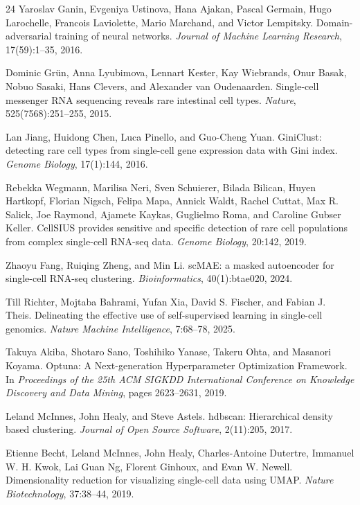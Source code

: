\documentclass[11pt,a4paper]{article}
\begin{document}
\begin{thebibliography}{24}
Yaroslav Ganin, Evgeniya Ustinova, Hana Ajakan, Pascal Germain, Hugo Larochelle, Francois Laviolette, Mario Marchand, and Victor Lempitsky.
\newblock Domain-adversarial training of neural networks.
\newblock \textit{Journal of Machine Learning Research}, 17(59):1--35, 2016.


Dominic Grün, Anna Lyubimova, Lennart Kester, Kay Wiebrands, Onur Basak, Nobuo Sasaki, Hans Clevers, and Alexander van Oudenaarden.
\newblock Single-cell messenger RNA sequencing reveals rare intestinal cell types.
\newblock \textit{Nature}, 525(7568):251--255, 2015.

Lan Jiang, Huidong Chen, Luca Pinello, and Guo-Cheng Yuan.
\newblock GiniClust: detecting rare cell types from single-cell gene expression data with Gini index.
\newblock \textit{Genome Biology}, 17(1):144, 2016.

Rebekka Wegmann, Marilisa Neri, Sven Schuierer, Bilada Bilican, Huyen Hartkopf, Florian Nigsch, Felipa Mapa, Annick Waldt, Rachel Cuttat, Max R. Salick, Joe Raymond, Ajamete Kaykas, Guglielmo Roma, and Caroline Gubser Keller.
\newblock CellSIUS provides sensitive and specific detection of rare cell populations from complex single-cell RNA-seq data.
\newblock \textit{Genome Biology}, 20:142, 2019.

Zhaoyu Fang, Ruiqing Zheng, and Min Li.
\newblock scMAE: a masked autoencoder for single-cell RNA-seq clustering.
\newblock \textit{Bioinformatics}, 40(1):btae020, 2024.

Till Richter, Mojtaba Bahrami, Yufan Xia, David S. Fischer, and Fabian J. Theis.
\newblock Delineating the effective use of self-supervised learning in single-cell genomics.
\newblock \textit{Nature Machine Intelligence}, 7:68--78, 2025.

Takuya Akiba, Shotaro Sano, Toshihiko Yanase, Takeru Ohta, and Masanori Koyama.
\newblock Optuna: A Next-generation Hyperparameter Optimization Framework.
\newblock In \textit{Proceedings of the 25th ACM SIGKDD International Conference on Knowledge Discovery and Data Mining}, pages 2623--2631, 2019.

Leland McInnes, John Healy, and Steve Astels.
\newblock hdbscan: Hierarchical density based clustering.
\newblock \textit{Journal of Open Source Software}, 2(11):205, 2017.

Etienne Becht, Leland McInnes, John Healy, Charles-Antoine Dutertre, Immanuel W. H. Kwok, Lai Guan Ng, Florent Ginhoux, and Evan W. Newell.
\newblock Dimensionality reduction for visualizing single-cell data using UMAP.
\newblock \textit{Nature Biotechnology}, 37:38--44, 2019.


\end{thebibliography}
\end{document}
